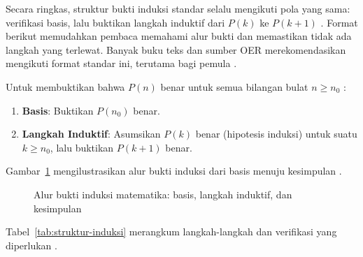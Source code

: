 Secara ringkas, struktur bukti induksi standar selalu mengikuti pola yang sama: verifikasi basis, lalu buktikan langkah induktif dari $P(k)$ ke $P(k+1)$ \cite{brilliant_induction,libretexts_induction}. Format berikut memudahkan pembaca memahami alur bukti dan memastikan tidak ada langkah yang terlewat. Banyak buku teks dan sumber OER merekomendasikan mengikuti format standar ini, terutama bagi pemula \cite{discrete_induction,uwo_induction}.

Untuk membuktikan bahwa $P(n)$ benar untuk semua bilangan bulat $n \geq n_0$ \cite{levin_discrete,discrete_induction}:

\begin{enumerate}
  \item \textbf{Basis}: Buktikan $P(n_0)$ benar.
  \item \textbf{Langkah Induktif}: Asumsikan $P(k)$ benar (hipotesis induksi) untuk suatu $k \geq n_0$, lalu buktikan $P(k+1)$ benar.
\end{enumerate}

Gambar~\ref{fig:alur-induksi} mengilustrasikan alur bukti induksi dari basis menuju kesimpulan \cite{discrete_induction,brilliant_induction}.

\begin{figure}[htbp]
\centering
{}
\caption{Alur bukti induksi matematika: basis, langkah induktif, dan kesimpulan}
\label{fig:alur-induksi}
\end{figure}

Tabel~\ref{tab:struktur-induksi} merangkum langkah-langkah dan verifikasi yang diperlukan \cite{levin_discrete,rosen2019}.

